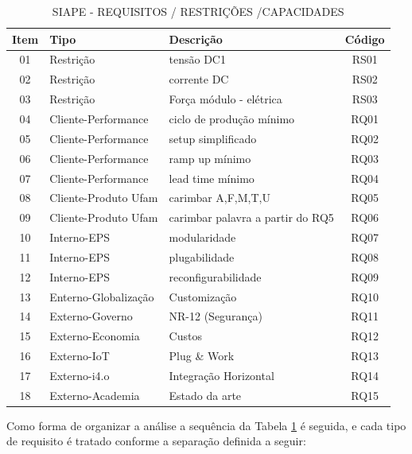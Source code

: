 \documentclass[10pt,letterpaper,twocolumn]{IEEEtran}
\begin{document}
\begin{table}[!h]
	\centering
	\caption{	SIAPE - REQUISITOS / RESTRIÇÕES /CAPACIDADES		}
	\begin{tabular}{ |c | p{2.5cm}| p{3cm}|c| } \hline
		\textbf{Item} 	   & \textbf{Tipo} &\textbf{ Descrição} & \textbf{Código}\\ \hline
		
		01   & Restrição & tensão DC1 & RS01 \\ \hline
		02   & Restrição & corrente DC & RS02 \\ \hline
		03   & Restrição & Força módulo - elétrica & RS03 \\ \hline
		04   & Cliente-Performance & ciclo de produção mínimo & RQ01 \\ \hline
		05   & Cliente-Performance & setup simplificado  & RQ02 \\ \hline
		06   & Cliente-Performance & ramp up mínimo & RQ03 \\ \hline
		07   & Cliente-Performance &  lead time mínimo& RQ04 \\ \hline
		08   & Cliente-Produto Ufam & carimbar A,F,M,T,U & RQ05 \\ \hline
		09   & Cliente-Produto Ufam & carimbar palavra a partir do RQ5 & RQ06 \\ \hline
		10   & Interno-EPS & modularidade & RQ07 \\ \hline
		11   & Interno-EPS & plugabilidade & RQ08 \\ \hline
		12   & Interno-EPS & reconfigurabilidade & RQ09 \\ \hline
		13   & Enterno-Globalização & Customização & RQ10 \\ \hline
		14   & Externo-Governo & NR-12 (Segurança) & RQ11 \\ \hline
		15   & Externo-Economia & Custos & RQ12 \\ \hline
		16   & Externo-IoT & Plug \& Work & RQ13 \\ \hline
		17   & Externo-i4.o & Integração Horizontal & RQ14 \\ \hline
		18   & Externo-Academia & Estado da arte & RQ15 \\ \hline
	\end{tabular}												
	\label{T14}\par
\end{table}
Como forma de organizar a análise a sequência da Tabela \ref{T14} é seguida, e cada tipo de requisito 
é tratado conforme a separação definida a seguir:  
\end{document}
